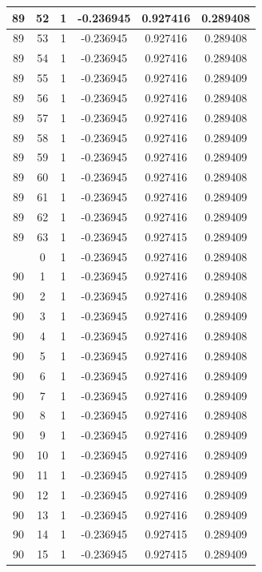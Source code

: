\documentclass[12pt,a4paper]{article}
\numberwithin{equation}{section}
\numberwithin{figure}{section}
\numberwithin{table}{section}
\begin{document}
\begin{longtable}{|c|c|c|c|c|c|}
89 & 52 & 1 & -0.236945 & 0.927416 & 0.289408 \\ \hline
89 & 53 & 1 & -0.236945 & 0.927416 & 0.289408 \\ \hline
89 & 54 & 1 & -0.236945 & 0.927416 & 0.289408 \\ \hline
89 & 55 & 1 & -0.236945 & 0.927416 & 0.289409 \\ \hline
89 & 56 & 1 & -0.236945 & 0.927416 & 0.289408 \\ \hline
89 & 57 & 1 & -0.236945 & 0.927416 & 0.289408 \\ \hline
89 & 58 & 1 & -0.236945 & 0.927416 & 0.289409 \\ \hline
89 & 59 & 1 & -0.236945 & 0.927416 & 0.289409 \\ \hline
89 & 60 & 1 & -0.236945 & 0.927416 & 0.289408 \\ \hline
89 & 61 & 1 & -0.236945 & 0.927416 & 0.289409 \\ \hline
89 & 62 & 1 & -0.236945 & 0.927416 & 0.289409 \\ \hline
89 & 63 & 1 & -0.236945 & 0.927415 & 0.289409 \\ \hline
\pagebreak
90 & 0 & 1 & -0.236945 & 0.927416 & 0.289408 \\ \hline
90 & 1 & 1 & -0.236945 & 0.927416 & 0.289408 \\ \hline
90 & 2 & 1 & -0.236945 & 0.927416 & 0.289408 \\ \hline
90 & 3 & 1 & -0.236945 & 0.927416 & 0.289409 \\ \hline
90 & 4 & 1 & -0.236945 & 0.927416 & 0.289408 \\ \hline
90 & 5 & 1 & -0.236945 & 0.927416 & 0.289408 \\ \hline
90 & 6 & 1 & -0.236945 & 0.927416 & 0.289409 \\ \hline
90 & 7 & 1 & -0.236945 & 0.927416 & 0.289409 \\ \hline
90 & 8 & 1 & -0.236945 & 0.927416 & 0.289408 \\ \hline
90 & 9 & 1 & -0.236945 & 0.927416 & 0.289409 \\ \hline
90 & 10 & 1 & -0.236945 & 0.927416 & 0.289409 \\ \hline
90 & 11 & 1 & -0.236945 & 0.927415 & 0.289409 \\ \hline
90 & 12 & 1 & -0.236945 & 0.927416 & 0.289409 \\ \hline
90 & 13 & 1 & -0.236945 & 0.927416 & 0.289409 \\ \hline
90 & 14 & 1 & -0.236945 & 0.927415 & 0.289409 \\ \hline
90 & 15 & 1 & -0.236945 & 0.927415 & 0.289409 \\ \hline

\end{longtable}
\end{document}

